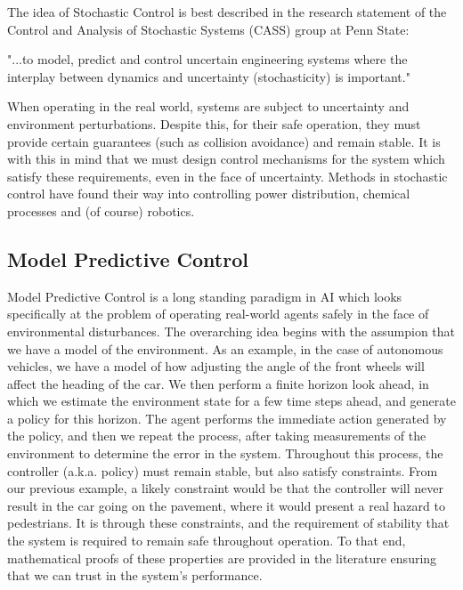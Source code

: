 \documentclass[preprint,11pt]{report}
\begin{document}
The idea of Stochastic Control is best described in the research statement of the Control and
Analysis of Stochastic Systems (CASS) group at Penn State:

\begin{displayquote}
	"...to model, predict and control uncertain engineering systems where the interplay between
	dynamics and uncertainty (stochasticity) is important."
\end{displayquote}

When operating in the real world, systems are subject to uncertainty and environment perturbations.
Despite this, for their safe operation, they must provide certain guarantees (such as collision
avoidance) and remain stable. It is with this in mind that we must design control mechanisms for the
system which satisfy these requirements, even in the face of uncertainty. Methods in stochastic
control have found their way into controlling power distribution, chemical processes and (of course)
robotics. 

\subsection*{Model Predictive Control}

Model Predictive Control is a long standing paradigm in AI which looks specifically at the problem
of operating real-world agents safely in the face of environmental disturbances. The overarching
idea begins with the assumpion that we have a model of the environment. As an example, in
the case of autonomous vehicles, we have a model of how adjusting the angle of the front wheels will
affect the heading of the car. We then perform a finite horizon look ahead, in which we estimate the
environment state for a few time steps ahead, and generate a policy for this horizon. The agent
performs the immediate action generated by the policy, and then we repeat the process, after taking
measurements of the environment to determine the error in the system. Throughout this process, the
controller (a.k.a. policy) must remain stable, but also satisfy constraints. From our previous
example, a likely constraint would be that the controller will never result in the car going on the
pavement, where it would present a real hazard to pedestrians. It is through these constraints, and
the requirement of stability that the system is required to remain safe throughout operation. To
that end, mathematical proofs of these properties are provided in the literature ensuring that we
can trust in the system's performance.
\end{document}
